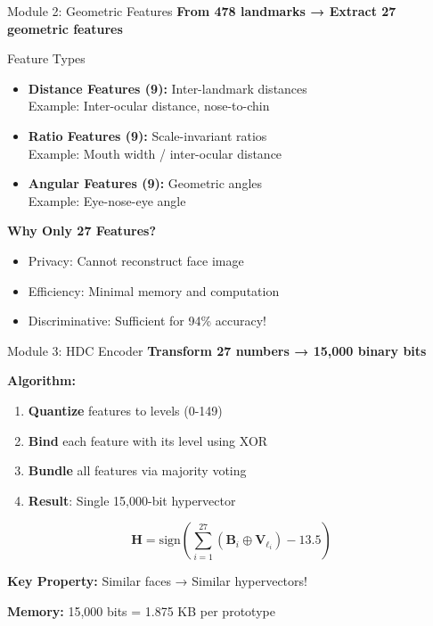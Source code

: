 \documentclass[aspectratio=169]{beamer}
\begin{document}
\begin{frame}{Module 2: Geometric Features}
\textbf{From 478 landmarks → Extract 27 geometric features}

\begin{block}{Feature Types}
\begin{itemize}
    \item \textbf{Distance Features (9):} Inter-landmark distances\\
    Example: Inter-ocular distance, nose-to-chin
    
    \item \textbf{Ratio Features (9):} Scale-invariant ratios\\
    Example: Mouth width / inter-ocular distance
    
    \item \textbf{Angular Features (9):} Geometric angles\\
    Example: Eye-nose-eye angle
\end{itemize}
\end{block}

\textbf{Why Only 27 Features?}
\begin{itemize}
    \item Privacy: Cannot reconstruct face image
    \item Efficiency: Minimal memory and computation
    \item Discriminative: Sufficient for 94\% accuracy!
\end{itemize}
\end{frame}

\begin{frame}{Module 3: HDC Encoder}
\textbf{Transform 27 numbers → 15,000 binary bits}

\textbf{Algorithm:}
\begin{enumerate}
    \item \textbf{Quantize} features to levels (0-149)
    \item \textbf{Bind} each feature with its level using XOR
    \item \textbf{Bundle} all features via majority voting
    \item \textbf{Result}: Single 15,000-bit hypervector
\end{enumerate}

\begin{equation*}
\mathbf{H} = \text{sign}\left(\sum_{i=1}^{27} (\mathbf{B}_i \oplus \mathbf{V}_{\ell_i}) - 13.5\right)
\end{equation*}

\textbf{Key Property:} Similar faces → Similar hypervectors!

\textbf{Memory:} 15,000 bits = 1.875 KB per prototype
\end{frame}
\end{document}

